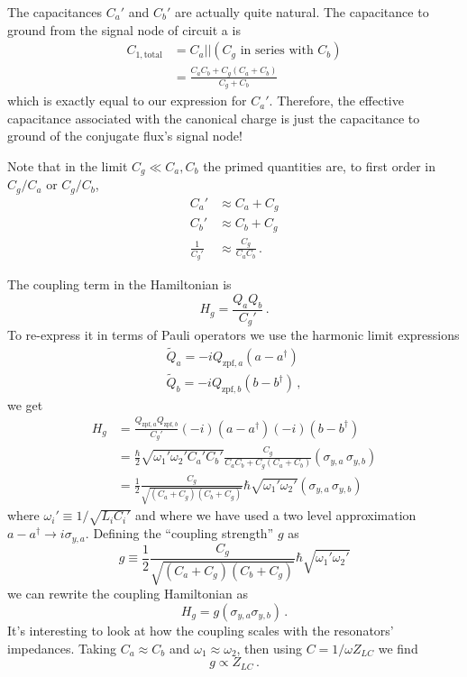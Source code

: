 The capacitances $C_a'$ and $C_b'$ are actually quite natural.
The capacitance to ground from the signal node of circuit a is
\begin{align*}
  C_{1, \textrm{total}}
  &= C_a || (C_g \textrm{ in series with } C_b) \\
  &= \frac{C_a C_b + C_g(C_a+C_b)}{C_g+C_b}
\end{align*}
which is exactly equal to our expression for $C_a'$.
Therefore, the effective capacitance associated with the canonical charge is just the capacitance to ground of the conjugate flux's signal node!

Note that in the limit $C_g \ll C_a, C_b$ the primed quantities are, to first order in $C_g / C_a$ or $C_g / C_b$,
\begin{align*}
  C_a' & \approx C_a + C_g \\
  C_b' & \approx C_b + C_g \\
  \frac{1}{C_g'} & \approx \frac{C_g}{C_a C_b} \, .
\end{align*}

The coupling term in the Hamiltonian is
\begin{equation}
  H_g = \frac{ Q_a Q_b} {C_g'} \, . \label{eq:sec:coupling:H_g}
\end{equation}
To re-express it in terms of Pauli operators we use the harmonic limit expressions
\begin{align}
  \tilde{Q}_a = -i Q_{\textrm{zpf}, a} (a - a^{\dagger}) \nonumber \\
  \tilde{Q}_b = -i Q_{\textrm{zpf}, b} (b - b^{\dagger}) \nonumber \, ,
\end{align}
we get
\begin{align*}
  H_g
  &= \frac{Q_{\textrm{zpf},a}Q_{\textrm{zpf},b}}{C_g'}
    (-i)(a - a^\dagger) (-i)(b - b^\dagger) \\
  &= \frac{\hbar}{2} \sqrt{\omega_1' \omega_2' C_a' C_b'}
    \frac{C_g}{C_a C_b + C_g(C_a + C_b)} (\sigma_{y,a} \, \sigma_{y,b}) \\
  &= \frac{1}{2}\frac{C_g}{\sqrt{(C_a + C_g) (C_b + C_g)}} \hbar
    \sqrt{\omega_1' \omega_2'} (\sigma_{y,a} \, \sigma_{y,b})
\end{align*}
where $\omega_i' \equiv 1 / \sqrt{L_i C_i'}$ and where we have used a two level approximation \mbox{$a - a^\dagger \rightarrow i \sigma_{y,a}$}.
Defining the ``coupling strength'' $g$ as
\begin{equation}
  g \equiv \frac{1}{2} \frac{C_g}{\sqrt{(C_a + C_g) (C_b + C_g)}} \hbar \sqrt{\omega_1' \omega_2'}
\end{equation}
we can rewrite the coupling Hamiltonian as
\begin{equation}
  H_g = g \left( \sigma_{y,a} \sigma_{y,b} \right) \, .
\end{equation}
It's interesting to look at how the coupling scales with the resonators' impedances.
Taking $C_a \approx C_b$ and $\omega_1 \approx \omega_2$, then using $C = 1 / \omega Z_{LC}$ we find
\begin{equation}
  g \propto Z_{LC} \, .
\end{equation}

